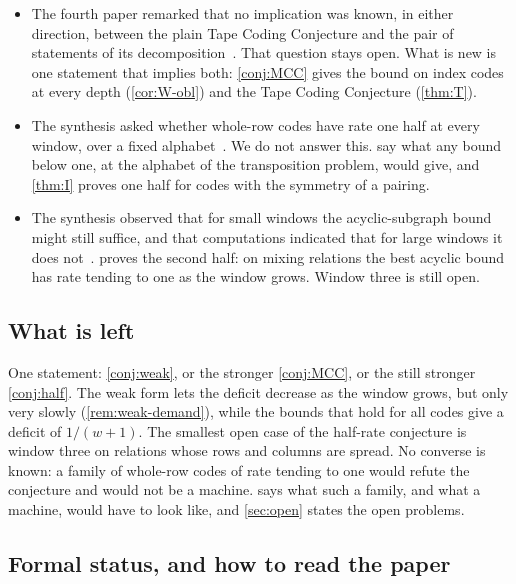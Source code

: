\begin{itemize}[leftmargin=1.5em]
\item The fourth paper remarked that no implication was known, in either direction, between the plain Tape Coding
Conjecture and the pair of statements of its decomposition~\cite[Remark~4.12]{FourthPaper2026}. That question stays
open. What is new is one statement that implies both: \cref{conj:MCC} gives the bound on index codes at every depth
(\cref{cor:W-obl}) and the Tape Coding Conjecture (\cref{thm:T}).
\item The synthesis asked whether whole-row codes have rate one half at every window, over a fixed
alphabet~\cite[Problem~9.4(c)]{SeventeenthPaper2026}. We do not answer this.  say what any bound
below one, at the alphabet of the transposition problem, would give, and \cref{thm:I} proves one half for codes with
the symmetry of a pairing.
\item The synthesis observed that for small windows the acyclic-subgraph bound might still suffice, and that
computations indicated that for large windows it does not~\cite[Section~9]{SeventeenthPaper2026}.  proves
the second half: on mixing relations the best acyclic bound has rate tending to one as the window grows. Window three
is still open.
\end{itemize}

\subsection{What is left}\label{sec:intro-left}

One statement: \cref{conj:weak}, or the stronger \cref{conj:MCC}, or the still stronger \cref{conj:half}. The weak form
lets the deficit decrease as the window grows, but only very slowly (\cref{rem:weak-demand}), while the bounds that
hold for all codes give a deficit of $1/(w+1)$. The smallest open case
of the half-rate conjecture is window three on relations whose rows and columns are spread. No converse is known: a
family of whole-row codes of rate tending to one would refute the conjecture and would not be a machine.
 says what such a family, and what a machine, would have to look like, and \cref{sec:open}
states the open problems.

\subsection{Formal status, and how to read the paper}\label{sec:intro-formal}

